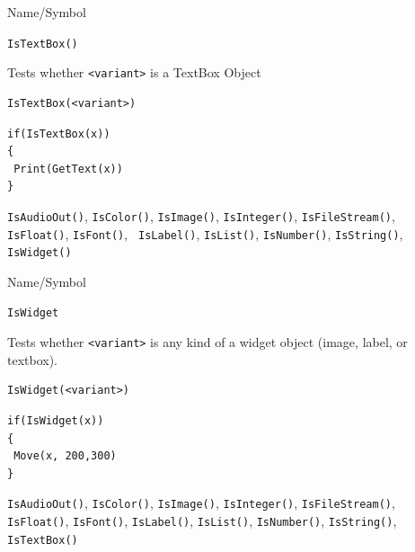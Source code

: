 \begin{desc}{Name/Symbol}
\item[Name/Symbol]	\verb+IsTextBox()+

\item[Description]	Tests whether \verb+<variant>+ is a TextBox Object

\item[Usage]
\begin{verbatim}
IsTextBox(<variant>)
\end{verbatim}

\item[Example]	
\begin{verbatim}
if(IsTextBox(x))
{
 Print(GetText(x))
}
\end{verbatim}

\item[See Also] \verb+IsAudioOut()+, \verb+IsColor()+,
  \verb+IsImage()+, \verb+IsInteger()+, \verb+IsFileStream()+,
  \verb+IsFloat()+, \verb+IsFont()+, \verb+ IsLabel()+,
  \verb+IsList()+, \verb+IsNumber()+, \verb+IsString()+,
  \verb+IsWidget()+
\end{desc}
\begin{desc}{Name/Symbol}
\item[Name/Symbol]	\verb+IsWidget+

\item[Description]	Tests whether \verb+<variant>+ is any kind of a widget object
		(image, label, or textbox).

\item[Usage]		
\begin{verbatim}
IsWidget(<variant>)
\end{verbatim}

\item[Example]	
\begin{verbatim}
if(IsWidget(x))
{
 Move(x, 200,300)
}
\end{verbatim}

\item[See Also] \verb+IsAudioOut()+, \verb+IsColor()+,
  \verb+IsImage()+, \verb+IsInteger()+, \verb+IsFileStream()+,
  \verb+IsFloat()+, \verb+IsFont()+, \verb+IsLabel()+,
  \verb+IsList()+, \verb+IsNumber()+, \verb+IsString()+,
  \verb+IsTextBox()+
\end{desc}


